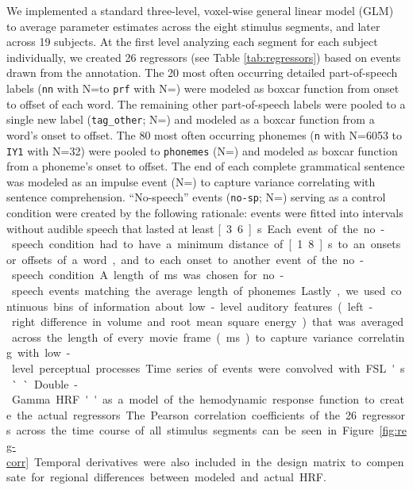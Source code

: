 \documentclass[10pt,a4paper,onecolumn]{article}
\begin{document}
We implemented a standard three-level, voxel-wise general linear model (GLM) to
average parameter estimates across the eight stimulus segments, and later across
19 subjects.
At the first level analyzing each segment for each subject individually, we
created 26 regressors (see Table \ref{tab:regressors}) based on events drawn
from the annotation.
The 20 most often occurring detailed part-of-speech labels (\texttt{nn} with
N=\rNnAll\space to \texttt{prf} with N=\rPrfAll) were modeled as boxcar function
from onset to offset of each word.
The remaining other part-of-speech labels were pooled to a single new label
(\texttt{tag\_other}; N=\rTagotherAll) and modeled as a boxcar function from a
word's onset to offset.
The 80 most often occurring phonemes (\texttt{n} with N=6053 to \texttt{IY1}
with N=32) were pooled to \texttt{phonemes} (N=\rPhonesAll) and modeled as
boxcar function from a phoneme's onset to offset.
The end of each complete grammatical sentence was modeled as an impulse event
(N=\rSentenceAll) to capture variance correlating with sentence comprehension.
``No-speech'' events (\texttt{no-sp}; N=\rNospAll) serving as a control
condition were created by the following rationale: events were fitted into
intervals without audible speech that lasted at least \unit[3.6]{s}.
Each event of the no-speech condition had to have a minimum distance of
\unit[1.8]{s} to an onsets or offsets of a word, and to each onset to another
event of the no-speech condition.
A length of \unit[70]{ms} was chosen for no-speech events matching the average
length of phonemes.
Lastly, we used continuous bins of information about low-level auditory features
(left-right difference in volume and root mean square energy) that was averaged
across the length of every movie frame (\unit[40]{ms}) to capture variance
correlating with low-level perceptual processes.
Time series of events were convolved with FSL's ``Double-Gamma HRF'' as a model
of the hemodynamic response function to create the actual regressors.
The Pearson correlation coefficients of the 26 regressors across the time course
of all stimulus segments can be seen in Figure \ref{fig:reg-corr}.
Temporal derivatives were also included in the design matrix to compensate for
regional differences between modeled and actual HRF.
\end{document}

